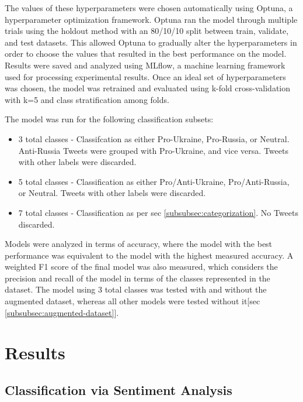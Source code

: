\documentclass[12pt,letterpaper,oneside,titlepage]{article}
\begin{document}
The values of these hyperparameters were chosen automatically using Optuna, a hyperparameter  optimization framework\cite{optuna}.
Optuna ran the model through multiple trials using the holdout method with an 80/10/10 split between train, validate, and test
datasets. This allowed Optuna to gradually alter the hyperparameters in order to choose the values that resulted in the best performance on the 
model. Results were saved and analyzed using MLflow, a machine learning framework used for processing experimental results\cite{mlflow}. 
Once an ideal set of hyperparameters was chosen, the model was retrained and evaluated using k-fold cross-validation with k=5
and class stratification among folds.

The model was run for the following classification subsets:
\begin{itemize}
    \item 3 total classes - Classifcation as either Pro-Ukraine, Pro-Russia, or Neutral. Anti-Russia Tweets were grouped with Pro-Ukraine, and vice versa. Tweets with other labels were discarded.
    \item 5 total classes - Classification as either Pro/Anti-Ukraine, Pro/Anti-Russia, or Neutral. Tweets with other labels were discarded.
    \item 7 total classes - Classification as per sec \ref{subsubsec:categorization}. No Tweets discarded.
\end{itemize}

Models were analyzed in terms of accuracy, where the model with the best performance was equivalent to the model with the highest measured 
accuracy. A weighted F1 score of the final model was also measured, which considers the precision and recall of the model in terms of the classes 
represented in the dataset. The model using 3 total classes was tested with and without the augmented dataset, 
whereas all other models were tested without it[sec \ref{subsubsec:augmented-dataset}].

\section{Results}\label{sec:results}

\subsection{Classification via Sentiment Analysis}\label{subsec:classification-via-sentiment-analysis}
\end{document}
